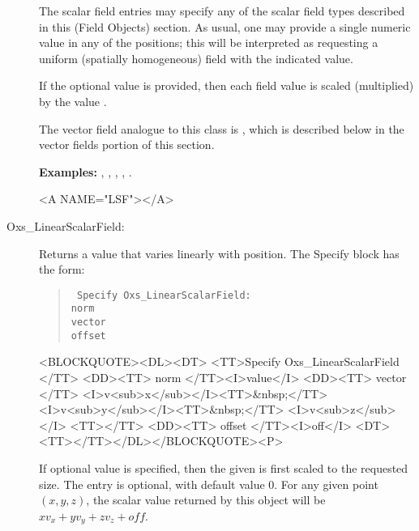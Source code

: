 \begin{description}
   The scalar field entries may specify any of the scalar field types
   described in this (Field Objects) section.  As usual, one may provide
   a single numeric value in any of the 
   positions; this will be interpreted as requesting a uniform (spatially
   homogeneous) field with the indicated value.

   If the optional  value is provided, then each
   field value is scaled (multiplied) by the value .

   The vector field analogue to this class is
   ,
   which is described below in the vector fields portion of this
   section.

\textbf{Examples:} , ,
, , .

\begin{rawhtml}<A NAME="LSF"></A>\end{rawhtml}%
%
\item[Oxs\_LinearScalarField:]
   Returns a value that varies linearly with position.  The Specify
   block has the form:
      \begin{latexonly}
      \begin{quote}\tt
      Specify Oxs\_LinearScalarField: \ocb\\
       \bi norm \\
       \bi vector \ocb{}\ccb\\
       \bi offset \\
      \ccb
      \end{quote}
      \end{latexonly}
      \begin{rawhtml}<BLOCKQUOTE><DL><DT>
      <TT>Specify Oxs_LinearScalarField {</TT>
      <DD><TT> norm </TT><I>value</I>
      <DD><TT> vector {</TT>
         <I>v<sub>x</sub></I><TT>&nbsp;</TT>
         <I>v<sub>y</sub></I><TT>&nbsp;</TT>
         <I>v<sub>z</sub></I> <TT>}</TT>
      <DD><TT> offset </TT><I>off</I>
      <DT><TT>}</TT></DL></BLOCKQUOTE><P>
      \end{rawhtml}
   If optional value  is specified, then the given
    is first scaled to the requested size.  The
    entry is optional, with default value 0. For any
   given point $(x,y,z)$, the scalar value returned by this
   object will be $xv_x+yv_y+zv_z + off$.


\end{description}
